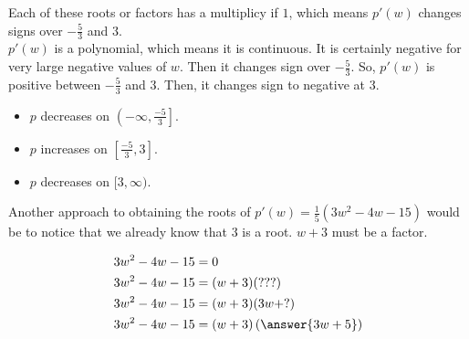 \documentclass{ximera}
\begin{document}
Each of these roots or factors has a multiplicy if $1$, which means $p'(w)$ changes signs over $-\frac{5}{3}$ and $3$. \\


$p'(w)$ is a polynomial, which means it is continuous. It is certainly negative for very large negative values of $w$.  Then it changes sign over $-\frac{5}{3}$.  So, $p'(w)$ is positive between $-\frac{5}{3}$ and $3$.  Then, it changes sign to negative at $3$.





\begin{itemize}
\item $p$ decreases on $\left(-\infty, \frac{-5}{3}\right]$.
\item $p$ increases on $\left[\frac{-5}{3}, 3\right]$.
\item $p$ decreases on $[3, \infty)$.
\end{itemize}



Another approach to obtaining the roots of $p'(w) = \frac{1}{5}(3w^2 - 4w - 15)$ would be to notice that we already know that $3$ is a root. $w+3$ must be a factor.



\begin{align*}
3w^2 - 4w - 15     & = 0        \\
3w^2 - 4w - 15     & = (w+3) (???)        \\
3w^2 - 4w - 15     & = (w+3) (3w + ?)        \\
3w^2 - 4w - 15     & = (w+3) \left( \answer{3w + 5} \right)        
\end{align*}
\end{document}
